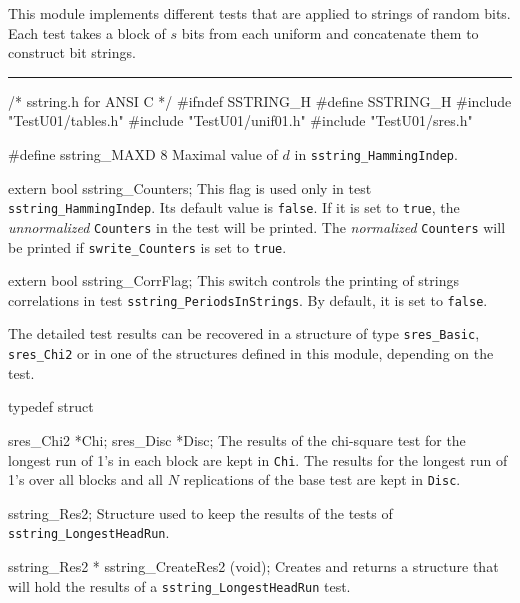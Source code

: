 
This module implements different tests that are applied to
strings of random bits.   Each test takes a block of $s$ bits
from each uniform and concatenate them to construct bit strings.
\resdef


\bigskip
\hrule
\code\hide
/* sstring.h for ANSI C */
#ifndef SSTRING_H
#define SSTRING_H
\endhide
#include "TestU01/tables.h"
#include "TestU01/unif01.h"
#include "TestU01/sres.h"
\endcode
\ifdetailed  %

\code


#define sstring_MAXD 8
\endcode
 \tab
 Maximal value of $d$ in {\tt sstring\_HammingIndep}.
 \endtab
\code


extern bool sstring_Counters;
\endcode
 \tab
   This flag is used only in test {\tt sstring\_HammingIndep}.
   Its default value is {\tt false}.
   If it is set to {\tt true}, the {\it unnormalized} {\tt Counters} in
   the test will be printed. The {\it normalized} {\tt Counters}
   will be printed if   {\tt swrite\_Counters} is set to  {\tt true}.
 \endtab
\code


extern bool sstring_CorrFlag;
\endcode
 \tab
  This switch controls the printing of strings correlations
  in test {\tt sstring\_PeriodsInStrings}. By default, it is set to
  {\tt false}.
 \endtab




The detailed test results can be recovered in a structure of type
{\tt sres\_Basic}, {\tt sres\_Chi2} or in one of the structures
defined in this module, depending on the test.

\code

typedef struct {

   sres_Chi2 *Chi;
   sres_Disc *Disc;
\endcode
 \tabb
  The results of the chi-square test for the longest run of 1's in each
  block are kept in {\tt Chi}.  The results for the longest run of 1's
  over all blocks and all $N$ replications of the base test are kept in
  {\tt Disc}.
 \endtabb
\code

} sstring_Res2;
\endcode
 \tab
  Structure used to keep the results of the tests of
  {\tt sstring\_LongestHeadRun}.
 \endtab
\code


sstring_Res2 * sstring_CreateRes2 (void);
\endcode
 \tab
  Creates and returns a structure that will hold the results
  of a  {\tt sstring\_LongestHeadRun} test.
 \endtab
\code



